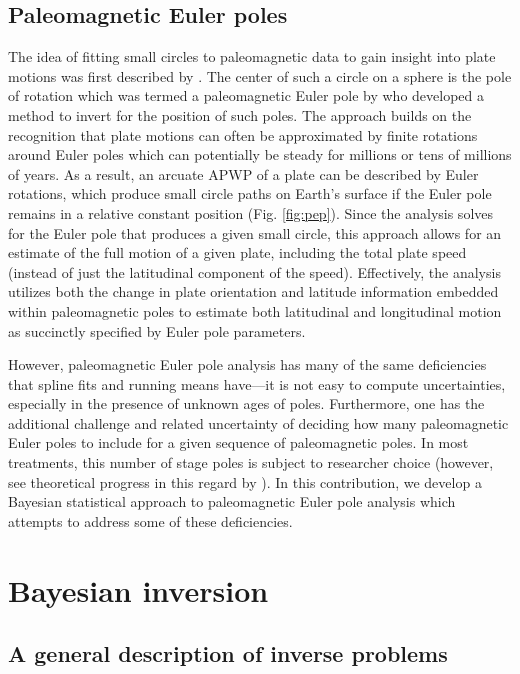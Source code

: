 \documentclass[]{agujournal2019}
\begin{document}
\subsection*{Paleomagnetic Euler poles}
The idea of fitting small circles to paleomagnetic data to gain insight into plate motions was first described by . The center of such a circle on a sphere is the pole of rotation which was termed a paleomagnetic Euler pole by  who developed a method to invert for the position of such poles. The approach builds on the recognition that plate motions can often be approximated by finite rotations around Euler poles which can potentially be steady for millions or tens of millions of years. As a result, an arcuate APWP of a plate can be described by Euler rotations, which produce small circle paths on Earth's surface if the Euler pole remains in a relative constant position (Fig. \ref{fig:pep}). Since the analysis solves for the Euler pole that produces a given small circle, this approach allows for an estimate of the full motion of a given plate, including the total plate speed (instead of just the latitudinal component of the speed). Effectively, the analysis utilizes both the change in plate orientation and latitude information embedded within paleomagnetic poles to estimate both latitudinal and longitudinal motion as succinctly specified by Euler pole parameters.

However, paleomagnetic Euler pole analysis has many of the same deficiencies that spline fits and running means have---it is not easy to compute uncertainties, especially in the presence of unknown ages of poles. Furthermore, one has the additional challenge and related uncertainty of deciding how many paleomagnetic Euler poles to include for a given sequence of paleomagnetic poles. In most treatments, this number of stage poles is subject to researcher choice (however, see theoretical progress in this regard by ). In this contribution, we develop a Bayesian statistical approach to paleomagnetic Euler pole analysis which attempts to address some of these deficiencies.

\section*{Bayesian inversion}
\subsection*{A general description of inverse problems}
\end{document}
